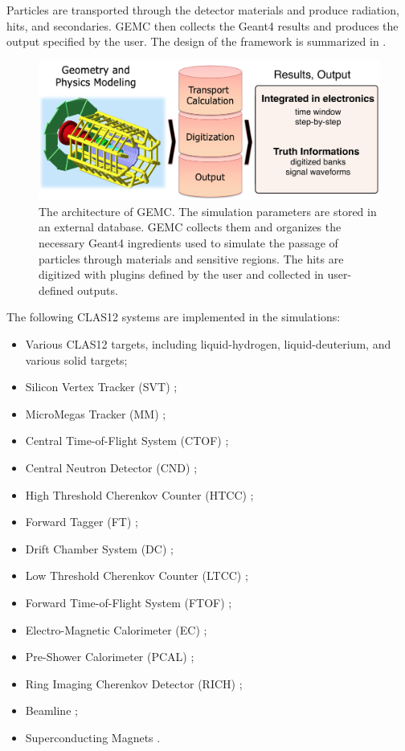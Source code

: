 Particles are transported through the detector materials and produce radiation, hits, and secondaries.
GEMC then collects the Geant4 results and produces the output specified by the user.
The design of the framework is summarized in .

\begin{figure}
	\centering
	\includegraphics[width=1.0\columnwidth,keepaspectratio]{img/gemcDesign.png}
	\caption{The architecture of GEMC. The simulation parameters are stored in an external database. GEMC collects
             them and organizes the necessary Geant4 ingredients used to simulate the
             passage of particles through materials and sensitive regions. The hits are digitized with
             plugins defined by the user and collected in user-defined outputs.  }
	\label{fig:gemcDesign}
\end{figure}

The following CLAS12 systems are implemented in the simulations:

\begin{itemize}
\item Various CLAS12 targets, including liquid-hydrogen, liquid-deuterium, and various solid targets;
\item Silicon Vertex Tracker (SVT) \cite{svt-nim};
\item MicroMegas Tracker (MM) \cite{mm-nim};
\item Central Time-of-Flight System (CTOF) \cite{ctof-nim};
\item Central Neutron Detector (CND) \cite{cnd-nim};
\item High Threshold Cherenkov Counter (HTCC) \cite{htcc-nim};
\item Forward Tagger (FT) \cite{ft-nim};
\item Drift Chamber System (DC) \cite{dc-nim};
\item Low Threshold Cherenkov Counter (LTCC) \cite{ltcc-nim};
\item Forward Time-of-Flight System (FTOF) \cite{ftof-nim};
\item Electro-Magnetic Calorimeter (EC) \cite{Amarian:2001zs};
\item Pre-Shower Calorimeter (PCAL) \cite{ec-nim};
\item Ring Imaging Cherenkov Detector (RICH) \cite{rich-nim};
\item Beamline \cite{beamline-nim};
\item Superconducting Magnets \cite{magnets-nim}.
\end{itemize}

